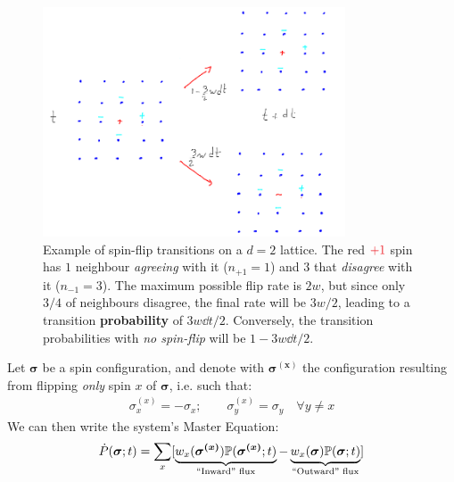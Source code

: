 \documentclass[../../main.tex]{subfiles}
\begin{document}
\begin{figure}[H]
    \centering
    \includegraphics[width=0.8\textwidth]{spin-flips.png}
    \caption{Example of spin-flip transitions on a $d=2$ lattice. The red $\textcolor{Red}{+1}$ spin has $1$ neighbour \textit{agreeing} with it ($n_{+1} = 1$) and $3$ that \textit{disagree} with it ($n_{-1} = 3$). The maximum possible flip rate is $2w$, but since only $3/4$ of neighbours disagree, the final rate will be $3w/2$, leading to a transition \textbf{probability} of $3w \dd{t}/2$. Conversely, the transition probabilities with \textit{no spin-flip} will be $1-3w\dd{t}/2$.}
    \label{fig:spin-flips}
\end{figure}

Let $\bm{\sigma}$ be a spin configuration, and denote with $\bm{\sigma^{(x)}}$ the configuration resulting from flipping \textit{only} spin $x$ of $\bm{\sigma}$, i.e. such that:
\begin{align*}
    \sigma_x^{(x)} = -\sigma_x; \qquad \sigma_y^{(x)} = \sigma_y \quad \forall y \neq x
\end{align*} 
We can then write the system's Master Equation:
\begin{align}\label{eqn:voting-ME}
    \dot{P}(\bm{\sigma};t) = \sum_x [\underbrace{w_x(\bm{\sigma^{(x)}}) \mathbb{P}(\bm{\sigma^{(x)}}; t)}_{\text{``Inward'' flux}}  - \underbrace{w_x(\bm{\sigma}) \mathbb{P}(\bm{\sigma}; t)}_{\text{``Outward'' flux}} ]
\end{align}

\end{document}
